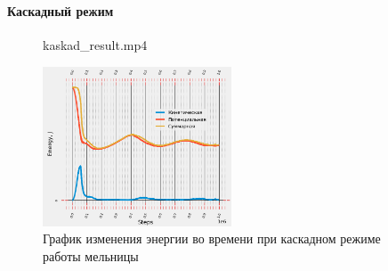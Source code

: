 \documentclass[c]{beamer}  %
\begin{document}
\begin{frame}
\frametitle{\insertsection} 
\framesubtitle{Каскадный режим}
\begin{figure}[ht]
     		{kaskad_result.mp4}
\end{figure}
\begin{figure}[H]
	\centering
	\includegraphics[width=0.5\textwidth]{kaskad_energy}
	\caption{График изменения энергии во времени при каскадном режиме работы мельницы}
	\label{pic:kaskad_energy}
\end{figure} 
\end{frame}
\end{document}
